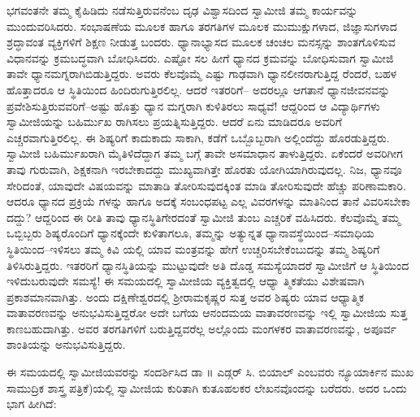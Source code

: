 ಭಗವಂತನೇ ತಮ್ಮ ಕೈಹಿಡಿದು ನಡೆಸುತ್ತಿರುವನೆಂಬ ದೃಢ ವಿಶ್ವಾಸದಿಂದ ಸ್ವಾಮೀಜಿ ತಮ್ಮ ಕಾರ್ಯವನ್ನು ಮುಂದುವರಿಸಿದರು. ಸಂಭಾಷಣೆಯ ಮೂಲಕ ಹಾಗೂ ತರಗತಿಗಳ ಮೂಲಕ ಮುಮುಕ್ಷುಗಳಾದ, ಜಿಜ್ಞಾಸುಗಳಾದ ಶ್ರದ್ಧಾವಂತ ವ್ಯಕ್ತಿಗಳಿಗೆ ಶಿಕ್ಷಣ ನೀಡುತ್ತ ಬಂದರು. ಧ್ಯಾನಾಭ್ಯಾಸದ ಮೂಲಕ ಚಂಚಲ ಮನಸ್ಸನ್ನು ಶಾಂತಗೊಳಿಸುವ ವಿಧಾನವನ್ನು ಕ್ರಮಬದ್ಧವಾಗಿ ಬೋಧಿಸಿದರು. ಎಷ್ಟೋ ಸಲ ಹೀಗೆ ಧ್ಯಾನದ ಕ್ರಮವನ್ನು ಬೋಧಿಸುವಾಗ ಸ್ವಾಮೀಜಿ ತಾವೇ ಧ್ಯಾನಮಗ್ನರಾಗಿಬಿಡುತ್ತಿದ್ದರು. ಅವರು ಕೆಲವೊಮ್ಮೆ ಎಷ್ಟು ಗಾಢವಾಗಿ ಧ್ಯಾನಲೀನರಾಗುತ್ತಿದ್ದ ರೆಂದರೆ, ಬಹಳ ಹೊತ್ತಾದರೂ ಆ ಸ್ಥಿತಿಯಿಂದ ಹಿಂದಿರುಗುತ್ತಿರಲಿಲ್ಲ. ಆದರೆ ಇತರರಿಗೆ– ಅದರಲ್ಲೂ ಆಗತಾನೆ ಧ್ಯಾನಜೀವನವನ್ನು ಪ್ರವೇಶಿಸುತ್ತಿರುವವರಿಗೆ–ಅಷ್ಟು ಹೊತ್ತು ಧ್ಯಾನ ಮಗ್ನರಾಗಿ ಕುಳಿತಿರಲು ಸಾಧ್ಯವೆ! ಆದ್ದರಿಂದ ಆ ವಿದ್ಯಾರ್ಥಿಗಳು ಸ್ವಾಮೀಜಿಯನ್ನು ಬಹಿರ್ಮುಖ ರಾಗಿಸಲು ಪ್ರಯತ್ನಿಸುತ್ತಿದ್ದರು. ಆದರೆ ಏನು ಮಾಡಿದರೂ ಅವರಿಗೆ ಎಚ್ಚರವಾಗುತ್ತಿರಲಿಲ್ಲ. ಈ ಶಿಷ್ಯರಿಗೆ ಕಾದುಕಾದು ಸಾಕಾಗಿ, ಕಡೆಗೆ ಒಬ್ಬೊಬ್ಬರಾಗಿ ಅಲ್ಲಿಂದೆದ್ದು ಹೊರಡುತ್ತಿದ್ದರು. ಸ್ವಾಮೀಜಿ ಬಹಿರ್ಮುಖರಾಗಿ ಮೈತಿಳಿದೆದ್ದಾಗ ತಮ್ಮ ಬಗ್ಗೆ ತಾವೇ ಅಸಮಾಧಾನ ತಾಳುತ್ತಿದ್ದರು. ಏಕೆಂದರೆ ಅವರಿಗೀಗ ತಾವು ಗುರುವಾಗಿ, ಶಿಕ್ಷಕನಾಗಿ ಇರಬೇಕಾದದ್ದು ಮುಖ್ಯವಾಗಿತ್ತೇ ಹೊರತು ಯೋಗಿಯಾಗಿರುವುದಲ್ಲ. ನಿಜ, ಧ್ಯಾನವೂ ಸೇರಿದಂತೆ, ಯಾವುದೇ ವಿಷಯವನ್ನು ಮಾತಾಡಿ ತೋರಿಸುವುದಕ್ಕಿಂತ ಮಾಡಿ ತೋರಿಸುವುದೇ ಹೆಚ್ಚು ಪರಿಣಾಮಕಾರಿ. ಆದರೂ ಧ್ಯಾನದ ಪ್ರಕ್ರಿಯೆ ಗಳನ್ನು ಹಾಗೂ ಅದಕ್ಕೆ ಸಂಬಂಧಪಟ್ಟ ಎಲ್ಲ ವಿವರಗಳನ್ನು ಮಾತಿನಿಂದ ತಾನೆ ವಿವರಿಸಬೇಕಾ ದದ್ದು? ಆದ್ದರಿಂದ ಈ ರೀತಿ ತಾವು ಧ್ಯಾನಸ್ಥಿತಿಗೇರದಂತೆ ಸ್ವಾಮೀಜಿ ತುಂಬ ಎಚ್ಚರಿಕೆ ವಹಿಸಿದರು. ಕೆಲವೊಮ್ಮೆ ತಮ್ಮ ಒಬ್ಬಿಬ್ಬರು ಶಿಷ್ಯರೊಂದಿಗೆ ಧ್ಯಾನಕ್ಕೆಂದೇ ಕುಳಿತಾಗಲೂ, ತಮ್ಮನ್ನು ಅತ್ಯುನ್ನತ ಧ್ಯಾನಾವಸ್ಥೆಯಿಂದ–ಸಮಾಧಿಯ ಸ್ಥಿತಿಯಿಂದ–ಇಳಿಸಲು ತಮ್ಮ ಕಿವಿ ಯಲ್ಲಿ ಯಾವ ಮಂತ್ರವನ್ನು ಹೇಗೆ ಉಚ್ಚರಿಸಬೇಕೆಂಬುದನ್ನು ತಮ್ಮ ಶಿಷ್ಯರಿಗೆ ತಿಳಿಸಿರುತ್ತಿದ್ದರು. ಇತರರಿಗೆ ಧ್ಯಾನಸ್ಥಿತಿಯನ್ನು ಮುಟ್ಟುವುದೇ ಅತಿ ದೊಡ್ಡ ಸಮಸ್ಯೆಯಾದರೆ ಸ್ವಾಮೀಜಿಗೆ ಆ ಸ್ಥಿತಿಯಿಂದ ಇಳಿದುಬರುವುದೇ ಸಮಸ್ಯೆ! ಈ ಸಮಯದಲ್ಲಿ ಸ್ವಾಮೀಜಿಯ ವ್ಯಕ್ತಿತ್ವದಲ್ಲಿ ಆಧ್ಯಾ ತ್ಮಿಕತೆಯು ವಿಶೇಷವಾಗಿ ಪ್ರಕಾಶಮಾನವಾಗಿತ್ತು. ಅಂದು ದಕ್ಷಿಣೇಶ್ವರದಲ್ಲಿ ಶ್ರೀರಾಮಕೃಷ್ಣರ ಸುತ್ತ ಅವರ ಶಿಷ್ಯರು ಯಾವ ಆಧ್ಯಾತ್ಮಿಕ ವಾತಾವರಣವನ್ನು ಅನುಭವಿಸುತ್ತಿದ್ದರೋ ಅದೇ ಬಗೆಯ ಆನಂದಮಯ ವಾತಾವರಣವನ್ನು ಇಲ್ಲಿ ಸ್ವಾಮೀಜಿಯ ಸುತ್ತ ಕಾಣಬಹುದಾಗಿತ್ತು. ಅವರ ತರಗತಿಗಳಿಗೆ ಬರುತ್ತಿದ್ದವರೆಲ್ಲ ಅಲ್ಲೊಂದು ಮಂಗಳಕರ ವಾತಾವರಣವನ್ನು, ಅಪೂರ್ವ ಶಾಂತಿಯನ್ನು ಅನುಭವಿಸುತ್ತಿದ್ದರು.

ಈ ಸಮಯದಲ್ಲಿ ಸ್ವಾಮೀಜಿಯವರನ್ನು ಸಂದರ್ಶಿಸಿದ ಡಾ ॥ ಎಡ್ಗರ್ ಸಿ. ಬಿಯಾಲ್ ಎಂಬವರು ನ್ಯೂಯಾರ್ಕಿನ ಮುಖ ಸಾಮುದ್ರಿಕ ಶಾಸ್ತ್ರ ಪತ್ರಿಕೆ)ಯಲ್ಲಿ ಸ್ವಾಮೀಜಿಯ ಕುರಿತಾಗಿ ಕುತೂಹಲಕರ ಲೇಖನವೊಂದನ್ನು ಬರೆದರು. ಅದರ ಒಂದು ಭಾಗ ಹೀಗಿದೆ:

